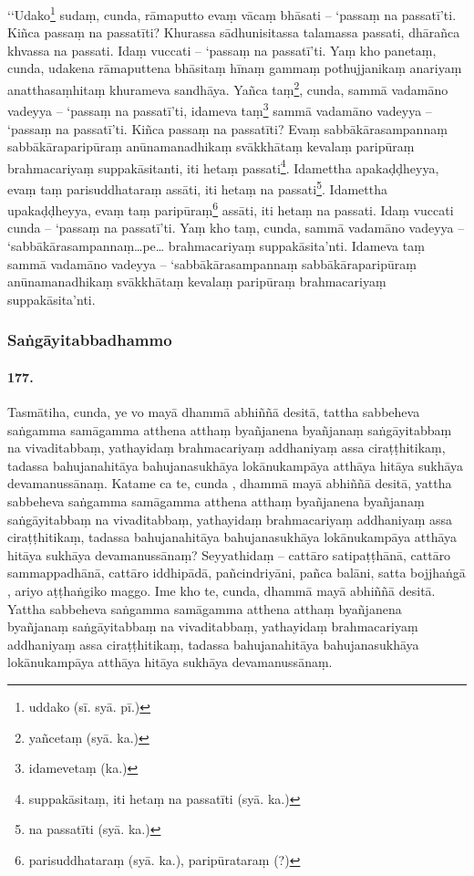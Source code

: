 ‘‘Udako\footnote{uddako (sī. syā. pī.)} sudaṃ, cunda, rāmaputto evaṃ vācaṃ bhāsati – ‘passaṃ na passatī’ti. Kiñca passaṃ na passatīti? Khurassa sādhunisitassa talamassa passati, dhārañca khvassa na passati. Idaṃ vuccati – ‘passaṃ na passatī’ti. Yaṃ kho panetaṃ, cunda, udakena rāmaputtena bhāsitaṃ hīnaṃ gammaṃ pothujjanikaṃ anariyaṃ anatthasaṃhitaṃ khurameva sandhāya. Yañca taṃ\footnote{yañcetaṃ (syā. ka.)}, cunda, sammā vadamāno vadeyya – ‘passaṃ na passatī’ti, idameva taṃ\footnote{idamevetaṃ (ka.)} sammā vadamāno vadeyya – ‘passaṃ na passatī’ti. Kiñca passaṃ na passatīti? Evaṃ sabbākārasampannaṃ sabbākāraparipūraṃ anūnamanadhikaṃ svākkhātaṃ kevalaṃ paripūraṃ brahmacariyaṃ suppakāsitanti, iti hetaṃ passati\footnote{suppakāsitaṃ, iti hetaṃ na passatīti (syā. ka.)}. Idamettha apakaḍḍheyya, evaṃ taṃ parisuddhataraṃ assāti, iti hetaṃ na passati\footnote{na passatīti (syā. ka.)}. Idamettha upakaḍḍheyya, evaṃ taṃ paripūraṃ\footnote{parisuddhataraṃ (syā. ka.), paripūrataraṃ (?)} assāti, iti hetaṃ na passati. Idaṃ vuccati cunda – ‘passaṃ na passatī’ti. Yaṃ kho taṃ, cunda, sammā vadamāno vadeyya – ‘sabbākārasampannaṃ…pe… brahmacariyaṃ suppakāsita’nti. Idameva taṃ sammā vadamāno vadeyya – ‘sabbākārasampannaṃ sabbākāraparipūraṃ anūnamanadhikaṃ svākkhātaṃ kevalaṃ paripūraṃ brahmacariyaṃ suppakāsita’nti.

\subsubsection{Saṅgāyitabbadhammo}

\paragraph{177.} Tasmātiha, cunda, ye vo mayā dhammā abhiññā desitā, tattha sabbeheva saṅgamma samāgamma atthena atthaṃ byañjanena byañjanaṃ saṅgāyitabbaṃ na vivaditabbaṃ, yathayidaṃ brahmacariyaṃ addhaniyaṃ assa ciraṭṭhitikaṃ, tadassa bahujanahitāya bahujanasukhāya lokānukampāya atthāya hitāya sukhāya devamanussānaṃ. Katame ca te, cunda , dhammā mayā abhiññā desitā, yattha sabbeheva saṅgamma samāgamma atthena atthaṃ byañjanena byañjanaṃ saṅgāyitabbaṃ na vivaditabbaṃ, yathayidaṃ brahmacariyaṃ addhaniyaṃ assa ciraṭṭhitikaṃ, tadassa bahujanahitāya bahujanasukhāya lokānukampāya atthāya hitāya sukhāya devamanussānaṃ? Seyyathidaṃ – cattāro satipaṭṭhānā, cattāro sammappadhānā, cattāro iddhipādā, pañcindriyāni, pañca balāni, satta bojjhaṅgā , ariyo aṭṭhaṅgiko maggo. Ime kho te, cunda, dhammā mayā abhiññā desitā. Yattha sabbeheva saṅgamma samāgamma atthena atthaṃ byañjanena byañjanaṃ saṅgāyitabbaṃ na vivaditabbaṃ, yathayidaṃ brahmacariyaṃ addhaniyaṃ assa ciraṭṭhitikaṃ, tadassa bahujanahitāya bahujanasukhāya lokānukampāya atthāya hitāya sukhāya devamanussānaṃ.

